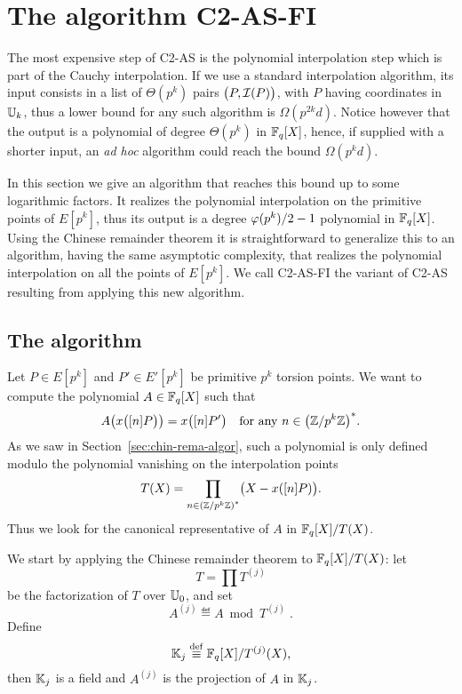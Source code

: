\section{The algorithm C2-AS-FI}
\label{sec:C2-AS-FI}

The most expensive step of C2-AS is the polynomial interpolation step
which is part of the Cauchy interpolation. If we use a standard
interpolation algorithm, its input consists in a list of $\Theta(p^k)$
pairs $\bigl(P, \mathcal{I}(P)\bigr)$, with $P$ having coordinates in $\mathbb{U}_k$,
thus a lower bound for any such algorithm is $\Omega(p^{2k}d)$. Notice
however that the output is a polynomial of degree $\Theta(p^k)$ in
$\mathbb{F}_q[X]$, hence, if supplied with a shorter input, an \emph{ad hoc}
algorithm could reach the bound $\Omega(p^kd)$.

In this section we give an algorithm that reaches this bound up to
some logarithmic factors. It realizes the polynomial interpolation on
the primitive points of $E[p^k]$, thus its output is a degree
$\varphi(p^k)/2-1$ polynomial in $\mathbb{F}_q[X]$. Using the Chinese remainder
theorem it is straightforward to generalize this to an algorithm,
having the same asymptotic complexity, that realizes the polynomial
interpolation on all the points of $E[p^k]$. We call C2-AS-FI the
variant of C2-AS resulting from applying this new algorithm.


\subsection{The algorithm}
Let $P\in E[p^k]$ and $P'\in E'[p^k]$ be primitive $p^k$ torsion
points. We want to compute the polynomial $A\in\mathbb{F}_q[X]$ such that
\begin{equation}
  A\bigl(x\bigl([n]P\bigr)\bigr) = x\bigl([n]P'\bigr)
  \quad\text{for any $n\in\left(\mathbb{Z}/p^k\mathbb{Z}\right)^\ast$.}
\end{equation}
As we saw in Section~\ref{sec:chin-rema-algor}, such a polynomial is
only defined modulo the polynomial vanishing on the interpolation
points
\begin{equation}
  T(X) = \prod_{n\in\left(\mathbb{Z}/p^k\mathbb{Z}\right)^\ast} \bigl(X - x([n]P)\bigr)
  \text{.}
\end{equation}
Thus we look for the canonical representative of $A$ in $\mathbb{F}_q[X]/T(X)$.

We start by applying the Chinese remainder theorem to $\mathbb{F}_q[X]/T(X)$:
let
\begin{equation}
  \label{eq:T}
  T = \prod T^{(j)}
\end{equation}
be the factorization of $T$ over $\mathbb{U}_0$, and set
\begin{equation}
  \label{eq:A}
  A^{(j)} \eqdef A \bmod T^{(j)}
  \;\text{.}
\end{equation}
Define
\begin{equation}
  \label{eq:187}
  \mathbb{K}_j\overset{\mathrm{def}}{\equiv}\mathbb{F}_q[X]/T^{(j)}(X)  
  \text{,}
\end{equation}
then $\mathbb{K}_j$ is a field and $A^{(j)}$ is the projection of $A$ in
$\mathbb{K}_j$.

